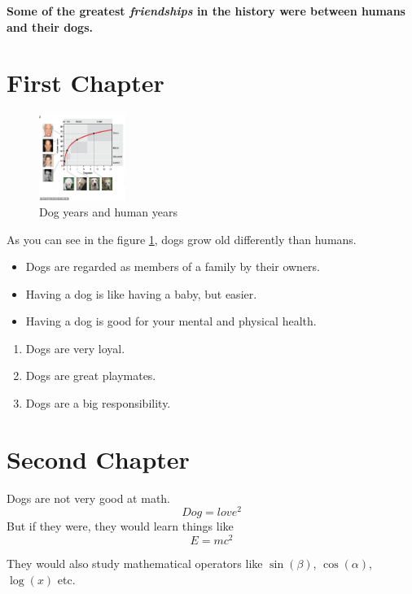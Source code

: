 \documentclass[12pt, letterpaper, twoside]{article}
\begin{document}
\textbf{Some of the greatest \emph{friendships} 
in the history 
were between humans and their dogs.}


\section{First Chapter}
 
 \begin{figure}[h]
    \centering
    \includegraphics[width=0.25\textwidth]{dog_years}
    \caption{Dog years and human years}
    \label{fig:dog_years}
\end{figure}
 
As you can see in the figure \ref{fig:dog_years}, dogs grow old differently than humans.

\begin{itemize}
  \item Dogs are regarded as members of a family by their owners.
  \item Having a dog is like having a baby, but easier.
  \item Having a dog is good for your mental and physical health.
\end{itemize}

\begin{enumerate}
  \item Dogs are very loyal.
  \item Dogs are great playmates.
  \item Dogs are a big responsibility.
\end{enumerate}

\section{Second Chapter}

Dogs are not very good at math.
\[ Dog=love ^2 \]
But if they were, they would learn things like 
\begin{equation}
E=mc^2
\end{equation}

They would also study mathematical operators like $\sin(\beta)$, $\cos(\alpha)$, $\log(x)$ etc.
\end{document}
